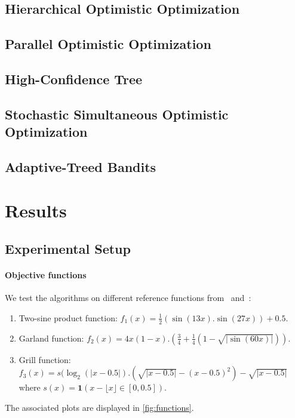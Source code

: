 \documentclass[a4paper,10pt]{article}
\begin{document}
\subsection{Hierarchical Optimistic Optimization}

\subsection{Parallel Optimistic Optimization}

\subsection{High-Confidence Tree}

\subsection{Stochastic Simultaneous Optimistic Optimization}

\subsection{Adaptive-Treed Bandits}

\section{Results}
\subsection{Experimental Setup}
\paragraph{Objective functions}
We test the algorithms on different reference functions from~\cite{valko2013stochastic} and~\cite{grill2015black}:
\begin{enumerate}
\item Two-sine product function: $f_1(x) = \frac{1}{2} (\sin(13x) . \sin(27x))+0.5$.
\item Garland function: $f_2(x) = 4x(1-x).(\frac{3}{4}+\frac{1}{4}(1-\sqrt{|\sin(60x)|}))$.
\item Grill function: $f_3(x) = s(\log_2(|x-0.5|).(\sqrt{|x-0.5|}-(x-0.5)^2)-\sqrt{|x-0.5|}$ where $s(x)=\mathbf{1}(x- \lfloor x \rfloor \in [0,0.5])$.
\end{enumerate}
The associated plots are displayed in \ref{fig:functions}.
\end{document}
